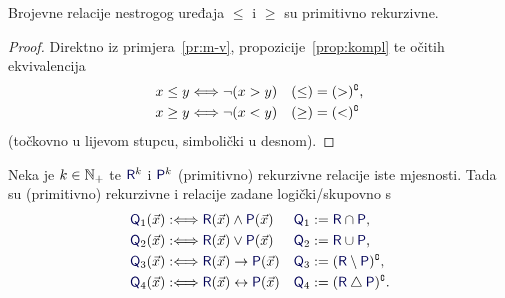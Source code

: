 \begin{korolar}[{name=[primitivna rekurzivnost relacija nestrogog uređaja]}]\label{kor:mj-vj}
Brojevne relacije nestrogog uređaja $\le$ i $\ge$ su primitivno rekurzivne.
\end{korolar}
\begin{proof}
Direktno iz primjera~\ref{pr:m-v}, propozicije~\ref{prop:kompl} te očitih ekvivalencija
\begin{align}
    x\le y&\Longleftrightarrow\lnot(x>y) & (\le) &= (>)\sp{{\scriptscriptstyle\complement}}\text,\\
    x\ge y&\Longleftrightarrow\lnot(x<y) & (\ge) &= (<)\sp{{\scriptscriptstyle\complement}}
\end{align}
(točkovno u lijevom stupcu, simbolički u desnom).
\end{proof}

\begin{propozicija}[{name=[logički veznici čuvaju (primitivnu) rekurzivnost]}]\label{prop:vezn}
Neka je $k\in{\mathbb N}_+$ te $\f R^k$ i $\f P^k$ (primitivno) rekurzivne relacije iste mjesnosti. Tada su (primitivno) rekurzivne i relacije zadane logički\slash skupovno s
\begin{align}
    \f Q_1(\vec x)&:\Longleftrightarrow\f R(\vec x)\land\f P(\vec x)
    &
    \f Q_1 &:=\f R \cap\f P\text,
    \\
    \f Q_2(\vec x)&:\Longleftrightarrow\f R(\vec x)\lor\f P(\vec x)
    &
    \f Q_2 &:=\f R \cup\f P\text,
    \\
    \f Q_3(\vec x)&:\Longleftrightarrow\f R(\vec x)\to\f P(\vec x)
    &
    \f Q_3 &:=(\f R\setminus\f P)\kompl\text,
    \\
    \f Q_4(\vec x)&:\Longleftrightarrow\f R(\vec x)\leftrightarrow\f P(\vec x)
    &
    \f Q_4 &:=(\f R\mathbin\triangle\f P)\kompl\text.
\end{align}
\end{propozicija}
